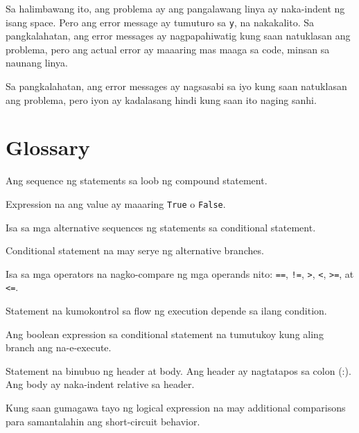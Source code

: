 \documentclass[10pt,]{book}
\providecommand{\tightlist}{%
  \setlength{\itemsep}{0pt}\setlength{\parskip}{0pt}}
\begin{document}
Sa halimbawang ito, ang problema ay ang pangalawang linya ay naka-indent
ng isang space. Pero ang error message ay tumuturo sa \texttt{y}, na
nakakalito. Sa pangkalahatan, ang error messages ay nagpapahiwatig kung
saan natuklasan ang problema, pero ang actual error ay maaaring mas
maaga sa code, minsan sa naunang linya.

Sa pangkalahatan, ang error messages ay nagsasabi sa iyo kung saan
natuklasan ang problema, pero iyon ay kadalasang hindi kung saan ito
naging sanhi.

\section{Glossary}\label{glossary-2}

\begin{description}
\tightlist
\item[body]
Ang sequence ng statements sa loob ng compound statement. 
\item[boolean expression]
Expression na ang value ay maaaring \texttt{True} o \texttt{False}.
 
\item[branch]
Isa sa mga alternative sequences ng statements sa conditional statement.
\item[chained conditional]
Conditional statement na may serye ng alternative branches.
 
\item[comparison operator]
Isa sa mga operators na nagko-compare ng mga operands nito: \texttt{==},
\texttt{!=}, \texttt{\textgreater{}}, \texttt{\textless{}},
\texttt{\textgreater{}=}, at \texttt{\textless{}=}.
\item[conditional statement]
Statement na kumokontrol sa flow ng execution depende sa ilang
condition.  
\item[condition]
Ang boolean expression sa conditional statement na tumutukoy kung aling
branch ang na-e-execute. 
\item[compound statement]
Statement na binubuo ng header at body. Ang header ay nagtatapos sa
colon (:). Ang body ay naka-indent relative sa header.
\item[guardian pattern]
Kung saan gumagawa tayo ng logical expression na may additional
comparisons para samantalahin ang short-circuit behavior.
 
\item[logical operator]

\end{description}
\end{document}
